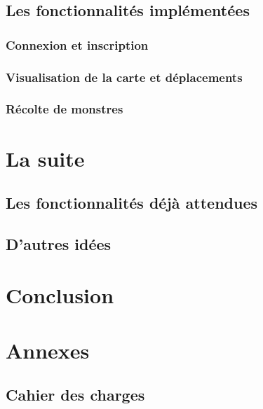 \documentclass[a4paper,11pt]{report}
\begin{document}
  \section{Les fonctionnalités implémentées}
    \subsection{Connexion et inscription}
    \subsection{Visualisation de la carte et déplacements}
    \subsection{Récolte de monstres}
\chapter{La suite}
  \section{Les fonctionnalités déjà attendues}
  \section{D'autres idées}
\chapter{Conclusion}
\chapter{Annexes}
  \section{Cahier des charges}
    
\end{document}
